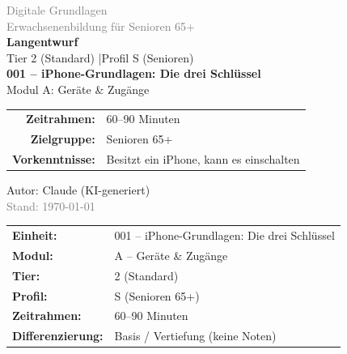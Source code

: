\documentclass[11pt,a4paper]{article}
\newcommand{\einheitnummer}{001}
\newcommand{\einheitthema}{iPhone-Grundlagen: Die drei Schlüssel}
\newcommand{\modulname}{Geräte \& Zugänge}
\newcommand{\modulbuchstabe}{A}
\newcommand{\zeitrahmen}{60--90 Minuten}
\newcommand{\autor}{Claude (KI-generiert)}
\begin{document}
\begin{titlepage}
    \centering
    \vspace*{2cm}
    {\Large\textcolor{gray}{Digitale Grundlagen}}\\[0.5cm]
    {\large\textcolor{gray}{Erwachsenenbildung für Senioren 65+}}\\[2cm]
    {\Huge\textcolor{fach}{\textbf{Langentwurf}}}\\[0.5cm]
    {\large Tier 2 (Standard) \quad|\quad Profil S (Senioren)}\\[2cm]
    {\LARGE\textbf{\einheitnummer{} -- \einheitthema}}\\[0.5cm]
    {\large Modul \modulbuchstabe: \modulname}\\[2cm]
    \begin{tabular}{rl}
        \textbf{Zeitrahmen:} & \zeitrahmen \\[0.3cm]
        \textbf{Zielgruppe:} & Senioren 65+ \\[0.3cm]
        \textbf{Vorkenntnisse:} & Besitzt ein iPhone, kann es einschalten \\[0.3cm]
    \end{tabular}
    \vfill
    {\large Autor: \autor}\\[0.3cm]
    {\normalsize\textcolor{gray}{Stand: \today}}
\end{titlepage}

\tableofcontents
\newpage

\begin{infobox}[Konfiguration]
\begin{tabular}{ll}
    \textbf{Einheit:} & \einheitnummer{} -- \einheitthema \\[0.3em]
    \textbf{Modul:} & \modulbuchstabe{} -- \modulname \\[0.3em]
    \textbf{Tier:} & 2 (Standard) \\[0.3em]
    \textbf{Profil:} & S (Senioren 65+) \\[0.3em]
    \textbf{Zeitrahmen:} & \zeitrahmen \\[0.3em]
    \textbf{Differenzierung:} & Basis / Vertiefung (keine Noten)
\end{tabular}
\end{infobox}

\end{document}
